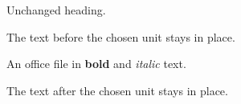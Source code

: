 \documentclass[11pt]{article}
\begin{document}
Unchanged heading.

The text before the chosen unit stays in place.

An office file in \textbf{bold} and \textit{italic} text.


\par\vspace{25mm}
The text after the chosen unit stays in place.
\end{document}
